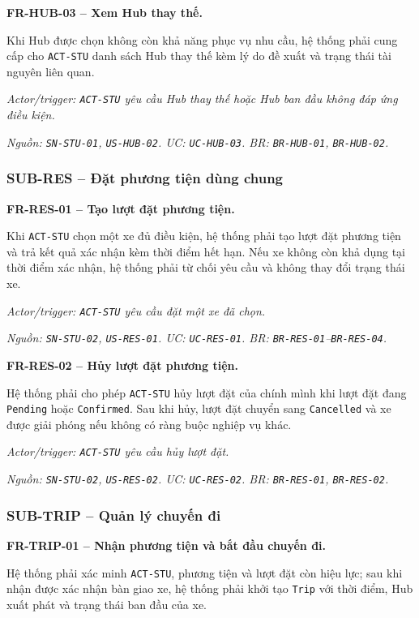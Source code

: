 \medskip
\noindent\textbf{FR-HUB-03 -- Xem Hub thay thế.}\par
\nopagebreak[4]
Khi Hub được chọn không còn khả năng phục vụ nhu cầu, hệ thống phải cung cấp cho \texttt{ACT-STU} danh sách Hub thay thế kèm lý do đề xuất và trạng thái tài nguyên liên quan.

\textit{Actor/trigger: \texttt{ACT-STU} yêu cầu Hub thay thế hoặc Hub ban đầu không đáp ứng điều kiện.}\par
\textit{Nguồn: \texttt{SN-STU-01}, \texttt{US-HUB-02}. UC: \texttt{UC-HUB-03}. BR: \texttt{BR-HUB-01}, \texttt{BR-HUB-02}.}

\subsubsection{SUB-RES -- Đặt phương tiện dùng chung}

\noindent\textbf{FR-RES-01 -- Tạo lượt đặt phương tiện.}\par
\nopagebreak[4]
Khi \texttt{ACT-STU} chọn một xe đủ điều kiện, hệ thống phải tạo lượt đặt phương tiện và trả kết quả xác nhận kèm thời điểm hết hạn. Nếu xe không còn khả dụng tại thời điểm xác nhận, hệ thống phải từ chối yêu cầu và không thay đổi trạng thái xe.

\textit{Actor/trigger: \texttt{ACT-STU} yêu cầu đặt một xe đã chọn.}\par
\textit{Nguồn: \texttt{SN-STU-02}, \texttt{US-RES-01}. UC: \texttt{UC-RES-01}. BR: \texttt{BR-RES-01}--\texttt{BR-RES-04}.}

\medskip
\noindent\textbf{FR-RES-02 -- Hủy lượt đặt phương tiện.}\par
\nopagebreak[4]
Hệ thống phải cho phép \texttt{ACT-STU} hủy lượt đặt của chính mình khi lượt đặt đang \texttt{Pending} hoặc \texttt{Confirmed}. Sau khi hủy, lượt đặt chuyển sang \texttt{Cancelled} và xe được giải phóng nếu không có ràng buộc nghiệp vụ khác.

\textit{Actor/trigger: \texttt{ACT-STU} yêu cầu hủy lượt đặt.}\par
\textit{Nguồn: \texttt{SN-STU-02}, \texttt{US-RES-02}. UC: \texttt{UC-RES-02}. BR: \texttt{BR-RES-01}, \texttt{BR-RES-02}.}

\subsubsection{SUB-TRIP -- Quản lý chuyến đi}

\noindent\textbf{FR-TRIP-01 -- Nhận phương tiện và bắt đầu chuyến đi.}\par
\nopagebreak[4]
Hệ thống phải xác minh \texttt{ACT-STU}, phương tiện và lượt đặt còn hiệu lực; sau khi nhận được xác nhận bàn giao xe, hệ thống phải khởi tạo \texttt{Trip} với thời điểm, Hub xuất phát và trạng thái ban đầu của xe.

